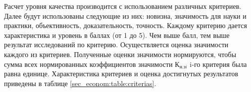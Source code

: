 Расчет уровня качества производится с использованием различных критериев. Далее будут использованы следующие из них: новизна, значимость для науки и практики, объективность, доказательность, точность. Каждому критерию дается характеристика и уровень в баллах (от 1 до 5). Чем выше балл, тем выше результат исследований по критерию. Осуществляется оценка значимости каждого из критериев. Полученные оценки значимости нормируются, чтобы сумма всех нормированных коэффициентов значимости $\text{К}_{\text{н.з}i} $ i-го критерия была равна единице. Характеристика критериев и оценка достигнутых результатов приведены в таблице \ref{sec_econom:table:criterias}.
